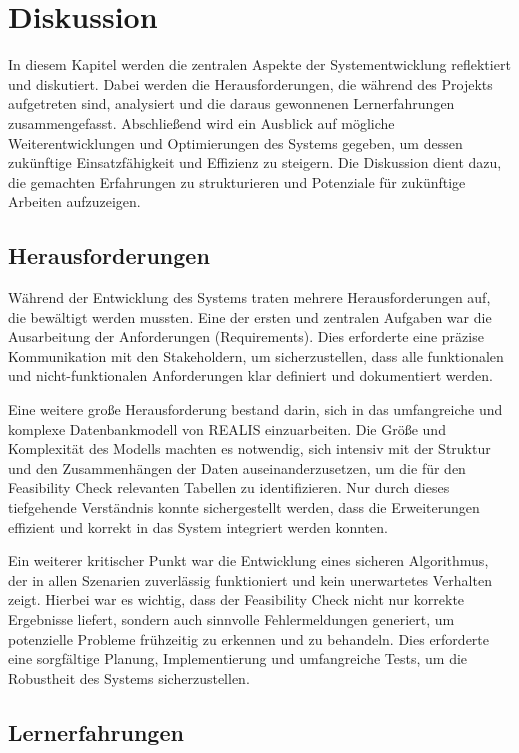 \chapter{Diskussion}
In diesem Kapitel werden die zentralen Aspekte der Systementwicklung reflektiert und diskutiert. Dabei werden die Herausforderungen, die während des Projekts aufgetreten sind, analysiert und die daraus gewonnenen Lernerfahrungen zusammengefasst. Abschließend wird ein Ausblick auf mögliche Weiterentwicklungen und Optimierungen des Systems gegeben, um dessen zukünftige Einsatzfähigkeit und Effizienz zu steigern. Die Diskussion dient dazu, die gemachten Erfahrungen zu strukturieren und Potenziale für zukünftige Arbeiten aufzuzeigen.
\section{Herausforderungen}

Während der Entwicklung des Systems traten mehrere Herausforderungen auf, die bewältigt werden mussten. Eine der ersten und zentralen Aufgaben war die Ausarbeitung der Anforderungen (Requirements). Dies erforderte eine präzise Kommunikation mit den Stakeholdern, um sicherzustellen, dass alle funktionalen und nicht-funktionalen Anforderungen klar definiert und dokumentiert werden. 

Eine weitere große Herausforderung bestand darin, sich in das umfangreiche und komplexe Datenbankmodell von \gls{REALIS} einzuarbeiten. Die Größe und Komplexität des Modells machten es notwendig, sich intensiv mit der Struktur und den Zusammenhängen der Daten auseinanderzusetzen, um die für den Feasibility Check relevanten Tabellen zu identifizieren. Nur durch dieses tiefgehende Verständnis konnte sichergestellt werden, dass die Erweiterungen effizient und korrekt in das System integriert werden konnten.

Ein weiterer kritischer Punkt war die Entwicklung eines sicheren Algorithmus, der in allen Szenarien zuverlässig funktioniert und kein unerwartetes Verhalten zeigt. Hierbei war es wichtig, dass der Feasibility Check nicht nur korrekte Ergebnisse liefert, sondern auch sinnvolle Fehlermeldungen generiert, um potenzielle Probleme frühzeitig zu erkennen und zu behandeln. Dies erforderte eine sorgfältige Planung, Implementierung und umfangreiche Tests, um die Robustheit des Systems sicherzustellen.

\section{Lernerfahrungen}


